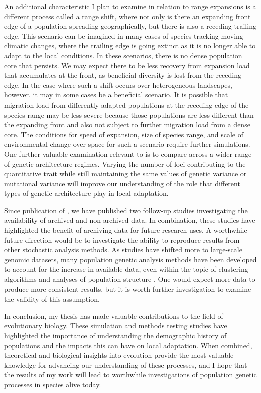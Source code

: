 An additional characteristic I plan to examine in relation to range expansions is a different process called a range shift, where not only is there an expanding front edge of a population spreading geographically, but there is also a receding trailing edge. This scenario can be imagined in many cases of species tracking moving climatic changes, where the trailing edge is going extinct as it is no longer able to adapt to the local conditions. In these scenarios, there is no dense population core that persists. We may expect there to be less recovery from expansion load that accumulates at the front, as beneficial diversity is lost from the receding edge. In the case where such a shift occurs over heterogeneous landscapes, however, it may in some cases be a beneficial scenario. It is possible that migration load from differently adapted populations at the receding edge of the species range may be less severe because those populations are less different than the expanding front and also not subject to further migration load from a dense core. The conditions for speed of expansion, size of species range, and scale of environmental change over space for such a scenario require further simulations. One further valuable examination relevant to  is to compare across a wider range of genetic architecture regimes. Varying the number of loci contributing to the quantitative trait while still maintaining the same values of genetic variance or mutational variance will improve our understanding of the role that different types of genetic architecture play in local adaptation.

Since publication of , we have published two follow-up studies investigating the availability of archived \citep{Vines:2013} and non-archived \citep{Vines:2014} data. In combination, these studies have highlighted the benefit of archiving data for future research uses. A worthwhile future direction would be to investigate the ability to reproduce results from other stochastic analysis methods. As studies have shifted more to large-scale genomic datasets, many population genetic analysis methods have been developed to account for the increase in available data, even within the topic of clustering algorithms and analyses of population structure \citep{Raj:2014,Bradburd:2016, Petkova:2015}. One would expect more data to produce more consistent results, but it is worth further investigation to examine the validity of this assumption.

In conclusion, my thesis has made valuable contributions to the field of evolutionary biology. These simulation and methods testing studies have highlighted the importance of understanding the demographic history of populations and the impacts this can have on local adaptation. When combined, theoretical and biological insights into evolution provide the most valuable knowledge for advancing our understanding of these processes, and I hope that the results of my work will lead to worthwhile investigations of population genetic processes in species alive today.

